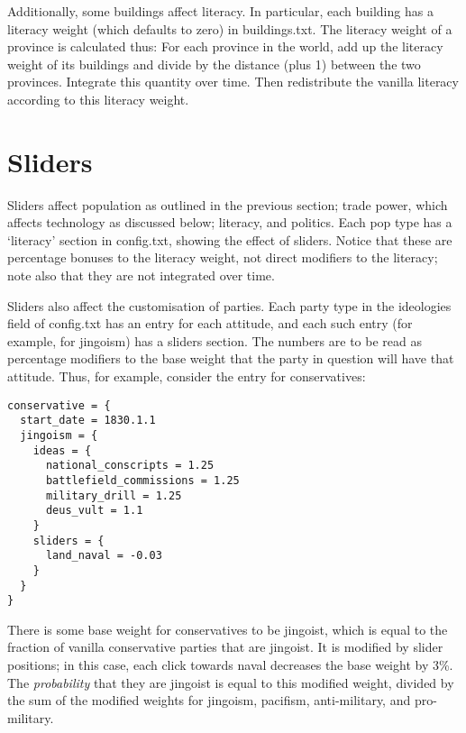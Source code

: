 \documentclass[12pt]{article}
\begin{document}
Additionally, some buildings affect literacy. In particular, each
building has a literacy weight (which defaults to zero) in
buildings.txt. The literacy weight of a province is calculated thus:
For each province in the world, add up the literacy weight of its
buildings and divide by the distance (plus 1) between the two
provinces. Integrate this quantity over time. Then redistribute the
vanilla literacy according to this literacy weight. 

\section{Sliders}

Sliders affect population as outlined in the previous section; trade
power, which affects technology as discussed below; literacy, and
politics. Each pop type has a `literacy' section in config.txt,
showing the effect of sliders. Notice that these are percentage
bonuses to the literacy weight, not direct modifiers to the literacy;
note also that they are not integrated over time. 

Sliders also affect the customisation of parties. Each party type in
the ideologies field of config.txt has an entry for each attitude, and
each such entry (for example, for jingoism) has a sliders section. The
numbers are to be read as percentage modifiers to the base weight
that the party in question will have that attitude. Thus, for example,
consider the entry for conservatives:

\begin{verbatim}
conservative = {
  start_date = 1830.1.1 
  jingoism = {
    ideas = {
      national_conscripts = 1.25  
      battlefield_commissions = 1.25
      military_drill = 1.25
      deus_vult = 1.1
    }
    sliders = {
      land_naval = -0.03 
    }
  }
}
\end{verbatim}

There is some base weight for conservatives to be jingoist, which is
equal to the fraction of vanilla conservative parties that are
jingoist. It is modified by slider positions; in this case, each click
towards naval decreases the base weight by 3\%. 
The \emph{probability} that they are jingoist is equal to this modified
weight, divided by the sum of the modified weights for jingoism, pacifism,
anti-military, and pro-military. 
\end{document}
